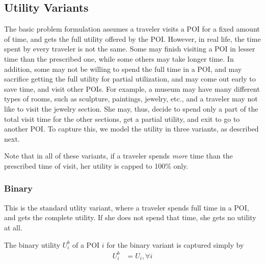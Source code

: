 \subsection{Utility Variants}
\label{sec:utility}

The basic problem formulation assumes a traveler visits a POI for a fixed amount
of time, and gets the full utility offered by the POI.  However, in real life,
the time spent by every traveler is not the same.  Some may finish visiting a
POI in lesser time than the prescribed one, while some others may take longer
time.  In addition, some may not be willing to spend the full time in a POI, and
may sacrifice getting the full utility for partial utilization, and may come out
early to save time, and visit other POIs.  For example, a museum may have many
different types of rooms, such as sculpture, paintings, jewelry, etc., and a
traveler may not like to visit the jewelry section.  She may, thus, decide to
spend only a part of the total visit time for the other sections, get a partial
utility, and exit to go to another POI.  To capture this, we model the utility
in three variants, as described next.

Note that in all of these variants, if a traveler spends \emph{more} time
than the prescribed time of visit, her utility is capped to 100\% only.

\subsubsection{\textbf{Binary}}
\label{sec:binary}

This is the standard utlity variant, where a traveler spends full time in a
POI, and gets the complete utility.  If she does not spend that time, she
gets no utility at all.

The binary utility $U^b_i$ of a POI $i$ for the binary variant is captured
simply by
%
\begin{align}
	\label{eq:binary}
	U^b_i & = U_i, \forall i
\end{align}



